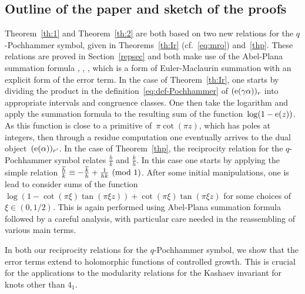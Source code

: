 \documentclass[11pt]{amsart}
\renewcommand{\mod}[1]{~\pr{\textnormal{mod}~#1}}
\theoremstyle{definition}
\newcommand{\pr}[1]{\mathchoice{\left( #1\right)}{(#1)}{(#1)}{(#1)}}
\newcommand{\e}[1][]{\ifthenelse{\equal{#1}{}}{{\rm e}}{\operatorname{e}\pr{ #1}}}
\newcommand{\1}{{\mathbf 1}}
\let\originalleft\left
\let\originalright\right
\renewcommand{\left}{\mathopen{}\mathclose\bgroup\originalleft}
\renewcommand{\right}{\aftergroup\egroup\originalright}
\numberwithin{equation}{section}
\begin{document}
\subsection{Outline of the paper and sketch of the proofs}
Theorem~\ref{th:1} and Theorem~\ref{th:2} are both based on two new relations for the $q$-Pochhammer symbol, given in Theorems~\ref{th:Ir} (cf.~\eqref{eq:mro}) and~\ref{thp}.  These relations are proved in Section~\ref{repsec} and both make use of the Abel-Plana summation formula \cite[p.23]{Abel1992}, \cite[p.408]{Plana1820}, \cite[Chapter~8.3.1]{Olver1997}, which is a form of Euler-Maclaurin summation with an explicit form of the error term.
%
In the case of Theorem~\ref{th:Ir}, one starts by dividing the product in the definition~\eqref{eq:def-Pochhammer} of $(\e[\gamma \alpha])_{r}$ into appropriate intervals and congruence classes. One then take the logarithm and apply the summation formula to the resulting sum of the function~$\log(1-\e(z))$. As this function is close to a primitive of~$\pi\cot(\pi z)$, which has poles at integers, then through a residue computation %
one eventually arrives to the dual object~$(\e[ \alpha])_{r'}$. 
%
In the case of Theorem~\ref{thp}, the reciprocity relation for the $q$-Pochhammer symbol relates $\frac{\overline h}{k}$ and $\frac{\overline k}{h}$. In this case one starts by applying the simple relation $\frac{\overline h}{k}\equiv -\frac{\overline k}{h}+\frac1{hk}\mod 1$. After some initial manipulations, one is lead to consider sums of the function $\log(1-\cot(\pi \xi)\tan(\pi \xi z))+\cot(\pi \xi)\tan(\pi \xi z)$ for some choices of $\xi\in(0,1/2)$. This is again performed using Abel-Plana summation formula followed by a careful analysis, with particular care needed in the reassembling of various main terms.
 
In both our reciprocity relations for the $q$-Pochhammer symbol, we show that the error terms extend to holomorphic functions of controlled growth. This is crucial for the applications to the modularity relations for the Kashaev invariant for knots other than $4_1$. 

\medskip
\end{document}
